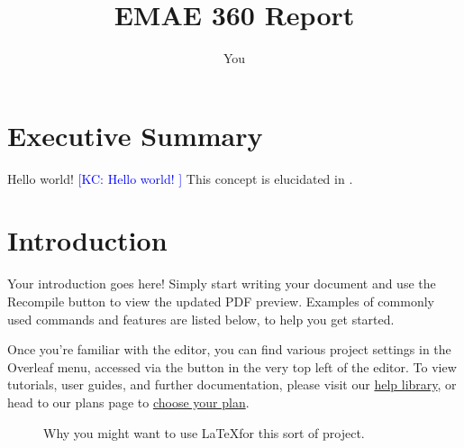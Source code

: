 \documentclass{article}
\title{EMAE 360 Report}
\author{You}
\makeatletter
\newcommand{\KCnote}[1]{{\textcolor{blue}{[KC: #1 \index{\thepage @ #1}]}}} %
\makeatother
\begin{document}
\maketitle
\newpage

\tableofcontents
\newpage

\section*{Executive Summary}
Hello world!
\KCnote{Hello world!}
This concept is elucidated in \cite{elmquist_2024}.

\newpage

\section{Introduction}

Your introduction goes here! Simply start writing your document and use the Recompile button to view the updated PDF preview. Examples of commonly used commands and features are listed below, to help you get started. 



Once you're familiar with the editor, you can find various project settings in the Overleaf menu, accessed via the button in the very top left of the editor. To view tutorials, user guides, and further documentation, please visit our \href{https://www.overleaf.com/learn}{help library}, or head to our plans page to \href{https://www.overleaf.com/user/subscription/plans}{choose your plan}.

\begin{figure}
    \centering
{}


    \caption{Why you might want to use \LaTeX for this sort of project.}
    \label{fig:whylatex}
\end{figure}
\end{document}
